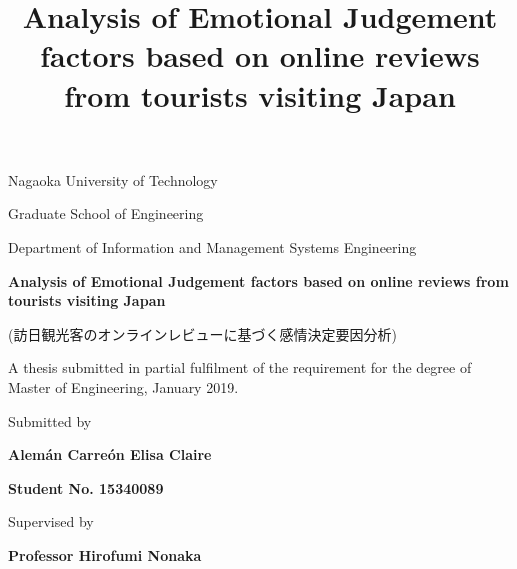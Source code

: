 \documentclass[review]{elsarticle}
\begin{document}

\begin{titlingpage}

\begin{centering}

\Large{
Nagaoka University of Technology
}

\bigskip

\large{
Graduate School of Engineering
}

\bigskip

\large{
Department of Information and Management Systems Engineering
}

\bigskip
\bigskip
\bigskip
\bigskip
\bigskip
\bigskip
\bigskip

\title{Analysis of Emotional Judgement factors based on online reviews from tourists visiting Japan}
\textbf{
\Large{
Analysis of Emotional Judgement factors based on online reviews from tourists visiting Japan
}}
\bigskip
\bigskip


\begin{CJK}{UTF8}{min}
(訪日観光客のオンラインレビューに基づく感情決定要因分析)
\end{CJK}


\bigskip
\bigskip
\bigskip
\bigskip
\bigskip
\bigskip
\bigskip

\normalsize{
A thesis submitted in partial fulfilment of the requirement for the degree of Master of Engineering, January 2019.
}
\bigskip

Submitted by

\textbf{
\large{
Alemán Carreón Elisa Claire
}}

\bigskip

\textbf{
Student No. 15340089
}
\bigskip
\bigskip

Supervised by
\medskip

\textbf{
\large{
Professor Hirofumi Nonaka
}}

\end{centering}

\end{titlingpage}

\clearpage
\thispagestyle{empty}
\tableofcontents{}
\clearpage

\setcounter{page}{1}

\linenumbers
\end{document}
